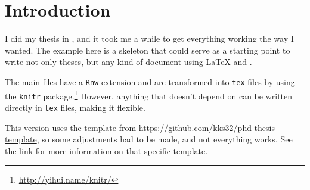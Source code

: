 \section{Introduction}
\label{sec:introduction}

I did my thesis in \R{}, and it took me a while to get everything working the way I wanted. The example here is a skeleton that could serve as a starting point to write not only theses, but any kind of document using \LaTeX{} and \R{}.

The main files have a \texttt{Rnw} extension and are transformed into \texttt{tex} files by using the \texttt{knitr} package.\footnote{\url{http://yihui.name/knitr/}} However, anything that doesn't depend on \R{} can be written directly in \texttt{tex} files, making it flexible.

This version uses the template from \url{https://github.com/kks32/phd-thesis-template}, so some adjustments had to be made, and not everything works. See the link for more information on that specific template.

